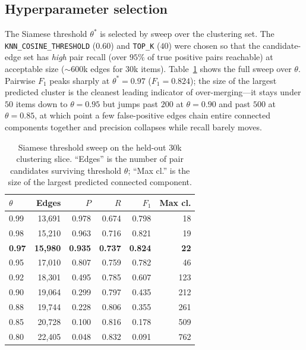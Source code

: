\documentclass[10pt,conference]{IEEEtran}
\begin{document}
\subsection{Hyperparameter selection}
The Siamese threshold $\theta^\ast$ is selected by sweep over the
clustering set. The \texttt{KNN\_COSINE\_THRESHOLD} ($0.60$) and
\texttt{TOP\_K} ($40$) were chosen so that the candidate-edge set has
\emph{high} pair recall (over $95\%$ of true positive pairs reachable) at
acceptable size ($\sim 600$k edges for $30$k items).
Table~\ref{tab:sweep} shows the full sweep over $\theta$. Pairwise
$F_1$ peaks sharply at $\theta^\ast = 0.97$ ($F_1 = 0.824$); the size of the
largest predicted cluster is the cleanest leading indicator of
over-merging---it stays under $50$ items down to $\theta = 0.95$ but jumps
past $200$ at $\theta = 0.90$ and past $500$ at $\theta = 0.85$, at which
point a few false-positive edges chain entire connected components together
and precision collapses while recall barely moves.

\begin{table}[t]
\centering
\caption{Siamese threshold sweep on the held-out 30k clustering slice. ``Edges''
is the number of pair candidates surviving threshold $\theta$; ``Max cl.''
is the size of the largest predicted connected component.}
\label{tab:sweep}
\begin{tabular}{lrrrrr}
\toprule
$\theta$ & Edges & $P$ & $R$ & $F_1$ & Max cl. \\
\midrule
0.99 & 13{,}691 & 0.978 & 0.674 & 0.798 & 18  \\
0.98 & 15{,}210 & 0.963 & 0.716 & 0.821 & 19  \\
\textbf{0.97} & \textbf{15{,}980} & \textbf{0.935} & \textbf{0.737} & \textbf{0.824} & \textbf{22}  \\
0.95 & 17{,}010 & 0.807 & 0.759 & 0.782 & 46  \\
0.92 & 18{,}301 & 0.495 & 0.785 & 0.607 & 123 \\
0.90 & 19{,}064 & 0.299 & 0.797 & 0.435 & 212 \\
0.88 & 19{,}744 & 0.228 & 0.806 & 0.355 & 261 \\
0.85 & 20{,}728 & 0.100 & 0.816 & 0.178 & 509 \\
0.80 & 22{,}405 & 0.048 & 0.832 & 0.091 & 762 \\
\bottomrule
\end{tabular}
\end{table}

\end{document}
